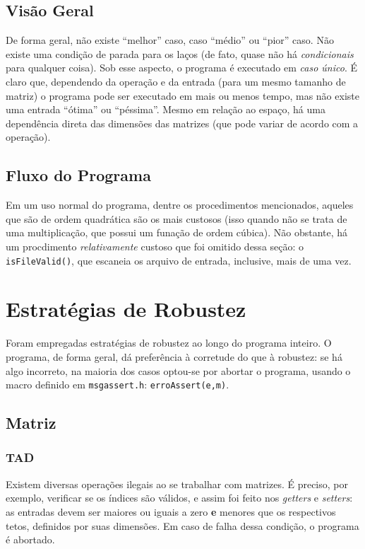 \documentclass{article}
\def\code#1{\texttt{#1}}
\begin{document}
\subsection{Visão Geral}

De forma geral, não existe ``melhor'' caso, caso ``médio'' ou ``pior'' caso. Não existe uma condição de parada para os laços (de fato, quase não há \textit{condicionais} para qualquer coisa). Sob esse aspecto, o programa é executado em \textit{caso único}. É claro que, dependendo da operação e da entrada (para um mesmo tamanho de matriz) o programa pode ser executado em mais ou menos tempo, mas não existe uma entrada ``ótima'' ou ``péssima''. Mesmo em relação ao espaço, há uma dependência direta das dimensões das matrizes (que pode variar de acordo com a operação).

\subsection{Fluxo do Programa}

Em um uso normal do programa, dentre os procedimentos mencionados, aqueles que são de ordem quadrática são os mais custosos (isso quando não se trata de uma multiplicação, que possui um funação de ordem cúbica). Não obstante, há um procdimento \textit{relativamente} custoso que foi omitido dessa seção: o \code{isFileValid()}, que escaneia os arquivo de entrada, inclusive, mais de uma vez.


\section{Estratégias de Robustez}

Foram empregadas estratégias de robustez ao longo do programa inteiro. O programa, de forma geral, dá preferência à corretude do que à robustez: se há algo incorreto, na maioria dos casos optou-se por abortar o programa, usando o macro definido em \code{msgassert.h}: \code{erroAssert(e,m)}.

\subsection{Matriz}

\subsubsection{TAD}

Existem diversas operações ilegais ao se trabalhar com matrizes. É preciso, por exemplo, verificar se os índices são válidos, e assim foi feito nos \textit{getters} e \textit{setters}: as entradas devem ser maiores ou iguais a zero \textbf{e} menores que os respectivos tetos, definidos por suas dimensões. Em caso de falha dessa condição, o programa é abortado.
\end{document}
